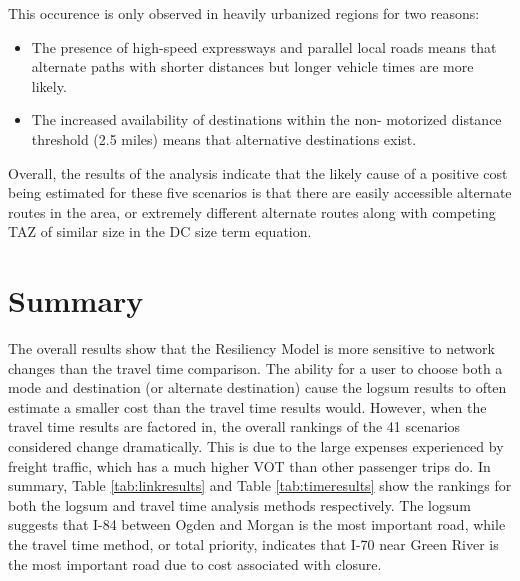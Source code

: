 This occurence is only observed in heavily urbanized regions for two reasons:
\begin{itemize}
	\item The presence of high-speed expressways and parallel local roads
  means that alternate paths with shorter distances but longer vehicle
  times are more likely.
	\item The increased availability of destinations within the non-
  motorized distance threshold (2.5 miles) means that alternative
  destinations exist.

\end{itemize}

Overall, the results of the analysis indicate that the likely cause of a
positive cost being estimated for these five scenarios is that there are
easily
accessible alternate routes in the area, or extremely different alternate
routes along with competing TAZ of similar size in the DC size term
equation.

\section{Summary}

The overall results show that the Resiliency Model is more sensitive to
network changes than the travel time comparison. The ability for a user to
choose both a mode and destination (or alternate destination) cause the
logsum results to often estimate a smaller cost than the travel time
results would. However, when the travel time results are factored in, the
overall rankings of the 41 scenarios considered change dramatically. This
is due to the large expenses experienced by freight traffic, which has a
much higher VOT than other passenger trips do. In summary, Table
\ref{tab:linkresults} and Table \ref{tab:timeresults} show the rankings
for both the logsum and travel time analysis methods respectively. The
logsum suggests that I-84 between Ogden and Morgan is the most important
road, while the travel time method, or total priority, indicates that I-70
near Green River is the most important road due to cost associated with
closure.
